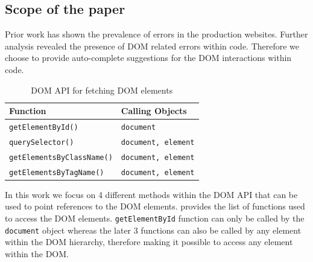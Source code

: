 	\subsection{Scope of the paper}
	\label{Sec:Scope}
	
	Prior work  has shown the prevalence of \javascript errors in the production websites.\cite{ocariza2011javascript} Further analysis revealed the presence of DOM related errors within \javascript code.\cite{ocariza2013empirical} Therefore we choose to provide auto-complete suggestions for the DOM interactions within \javascript code. 
	
	\begin{table}
	{
		\scriptsize
		\begin{tabular}{ p{3.8cm} | p{3.8cm}}
  			\hline                        
  			\textbf{Function} & \textbf{Calling Objects} \\ \hline \hline
  			\texttt{getElementById()} & \texttt{document} \\ \hline
			\texttt{querySelector()} & \texttt{document, element} \\ \hline
			\texttt{getElementsByClassName()} & \texttt{document, element} \\ \hline
			\texttt{getElementsByTagName()} & \texttt{document, element} \\
  			\hline  
		\end{tabular}
	}
	\caption {DOM API for fetching DOM elements}
	\label{Table:API}		
	\end{table}

	
	In this work we focus on 4 different methods within the DOM API that can be used to point references to the DOM elements.  provides the list of functions used to access the DOM elements. \texttt{getElementById} function can only be called by the \texttt{document} object whereas the later 3 functions can also be called by any element within the DOM hierarchy, therefore making it possible to access any element within the DOM.
	
	
	